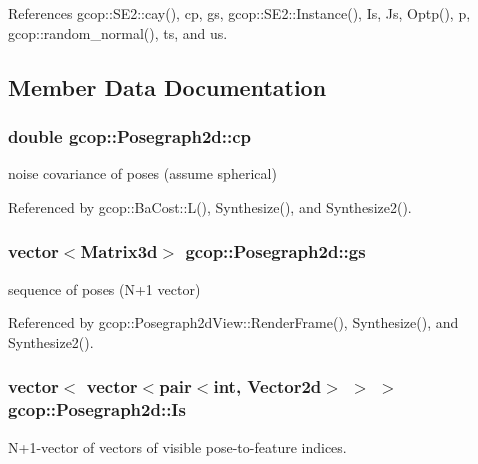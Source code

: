 \-References gcop\-::\-S\-E2\-::cay(), cp, gs, gcop\-::\-S\-E2\-::\-Instance(), \-Is, \-Js, \-Optp(), p, gcop\-::random\-\_\-normal(), ts, and us.



\subsection{\-Member \-Data \-Documentation}
\subsubsection[{cp}]{\setlength{\rightskip}{0pt plus 5cm}double {\bf gcop\-::\-Posegraph2d\-::cp}}\label{classgcop_1_1Posegraph2d_a91cc57e13b95fe0003af76115a3a0fed}


noise covariance of poses (assume spherical) 



\-Referenced by gcop\-::\-Ba\-Cost\-::\-L(), \-Synthesize(), and \-Synthesize2().

\subsubsection[{gs}]{\setlength{\rightskip}{0pt plus 5cm}vector$<$\-Matrix3d$>$ {\bf gcop\-::\-Posegraph2d\-::gs}}\label{classgcop_1_1Posegraph2d_a1c366b6095d2faa5d3351fbac8fdf865}


sequence of poses (\-N+1 vector) 



\-Referenced by gcop\-::\-Posegraph2d\-View\-::\-Render\-Frame(), \-Synthesize(), and \-Synthesize2().

\subsubsection[{\-Is}]{\setlength{\rightskip}{0pt plus 5cm}vector$<$ vector$<$pair$<$int, \-Vector2d$>$ $>$ $>$ {\bf gcop\-::\-Posegraph2d\-::\-Is}}\label{classgcop_1_1Posegraph2d_a6d298848116437dc095ae7fb1a06157a}


\-N+1-\/vector of vectors of visible pose-\/to-\/feature indices. 



